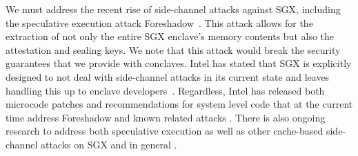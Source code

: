 %
%
%


%
We must address the recent rise of side-channel attacks against SGX, including
the speculative execution attack Foreshadow~\cite{foreshadow,
weisse2018foreshadow}.  
%
This attack allows for the extraction of not only the entire SGX enclave's
memory contents but also the attestation and sealing keys.  
%
We note that this attack would break the security guarantees that we provide
with conclaves.
%
Intel has stated that SGX is explicitly designed to not deal with side-channel
attacks in its current state and leaves handling this up to enclave
developers~\cite{sgx-sidechannel, sgx-developers}.
%
Regardless, Intel has released both microcode patches and recommendations for
system level code that at the current time address Foreshadow and known related
attacks \cite{sgx-patch, canella2018systematic, weisse2018foreshadow}.  
%
There is also ongoing research to address both speculative execution as well as
other cache-based side-channel attacks on SGX and in general
\cite{yan2018invisispec, oleksenko2018varys, canella2018systematic, shih2017t}.




